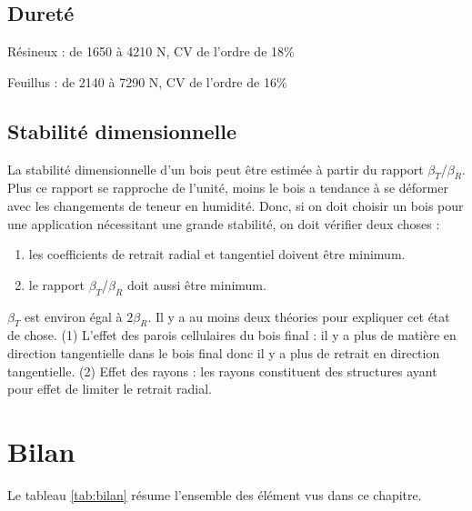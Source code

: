 \subsection{Dureté}

Résineux : de 1650 à 4210 N, CV de l'ordre de 18\%

Feuillus : de 2140 à 7290 N, CV de l'ordre de 16\%

\subsection{Stabilité dimensionnelle}

La stabilité dimensionnelle d'un bois peut être estimée à partir du rapport $\beta_T$/$\beta_R$. Plus ce rapport se rapproche de l'unité, moins le bois a tendance à se déformer avec les changements de teneur en humidité. Donc, si on doit choisir un bois pour une application nécessitant une grande stabilité, on doit vérifier deux choses :

\begin{enumerate}
\item les coefficients de retrait radial et tangentiel doivent être minimum.
\item le rapport $\beta_T$/$\beta_R$ doit aussi être minimum.
\end{enumerate}

$\beta_T$ est environ égal à $2\beta_R$. Il y a au moins deux théories pour expliquer cet état de chose. (1) L'effet des parois cellulaires du bois final : il y a plus de matière en direction tangentielle dans le bois final donc il y a plus de retrait en direction tangentielle. (2) Effet des rayons : les rayons constituent des structures ayant pour effet de limiter le retrait radial.


\section{Bilan}

Le tableau \ref{tab:bilan} résume l'ensemble des élément vus dans ce chapitre.

